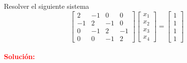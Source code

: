     Resolver el siguiente sistema
    \[
  	\begin{bmatrix}
    2 & -1 & 0 & 0 \\
    -1 & 2 & -1 & 0 \\
    0 & -1 & 2 & -1 \\
    0 & 0 & -1 & 2  
  	\end{bmatrix}
  	\begin{bmatrix}
    x_{1} \\
    x_{2} \\
    x_{3}  \\
    x_{4}   
  	\end{bmatrix}
  	=
  	\begin{bmatrix}
    1 \\
    1 \\
    1  \\
    1   
  	\end{bmatrix}
	\]\\
	\noindent \textcolor{red}{\bf Solución:}
